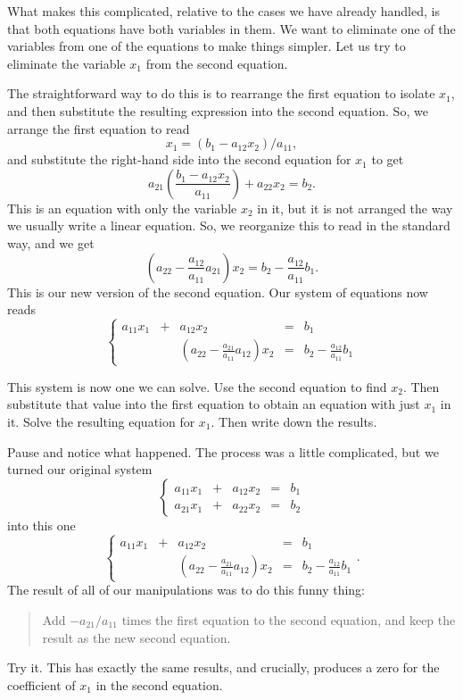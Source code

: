 \documentclass[00-livre-main.tex]{subfiles}
\begin{document}
What makes this complicated, relative to the cases we have already handled, is that both equations have both variables in them. We want to eliminate one of the variables from one of the equations to make things simpler. Let us try to eliminate the variable $x_1$ from the second equation.

The straightforward way to do this is to rearrange the first equation to isolate $x_1$, and then substitute the resulting expression into the second equation. So, we arrange the first equation to read
\[
x_1 = (b_1 - a_{12}x_2)/a_{11},
\]
and substitute the right-hand side into the second equation for $x_1$ to get
\[
a_{21} \left( \frac{b_1 - a_{12}x_2}{a_{11}}\right) + a_{22}x_2 = b_2.
\]
This is an equation with only the variable $x_2$ in it, but it is not arranged the way we usually write a linear equation. So, we reorganize this to read in the standard way, and we get
\[
\left( a_{22} - \frac{a_{12}}{a_{11}}a_{21}\right) x_2 = b_2 - \frac{a_{12}}{a_{11}} b_1.
\]
This is our new version of the second equation. Our system of equations now reads
\[
\left\{ \begin{array}{rrrrr}
a_{11}x_1 & + & a_{12}x_2 & = & b_1 \\
& & \left( a_{22} - \frac{a_{21}}{a_{11}}a_{12}\right) x_2 & = & b_2 - \frac{a_{12}}{a_{11}} b_1
\end{array}\right.
\]

This system is now one we can solve. Use the second equation to find $x_2$. Then substitute that value into the first equation to obtain an equation with just $x_1$ in it. Solve the resulting equation for $x_1$. Then write down the results.


Pause and notice what happened. The process was a little complicated, but we turned our original system 
\[
\left\{ \begin{array}{rrrrr}
a_{11}x_1 & + & a_{12}x_2 & = & b_1 \\
a_{21}x_1 & + & a_{22}x_2 & = & b_2
\end{array}\right.
\]
into this one
\[
\left\{ \begin{array}{rrrrr}
a_{11}x_1 & + & a_{12}x_2 & = & b_1 \\
& & \left( a_{22} - \frac{a_{21}}{a_{11}}a_{12}\right) x_2 & = & b_2 - \frac{a_{12}}{a_{11}} b_1
\end{array}\right. .
\]
The result of all of our manipulations was to do this funny thing:
\begin{quote}
Add $-a_{21}/a_{11}$ times the first equation to the second equation, and keep the result as the new second equation.
\end{quote}
Try it. This has exactly the same results, and crucially, produces a zero for the coefficient of $x_1$ in the second equation.
\end{document}
